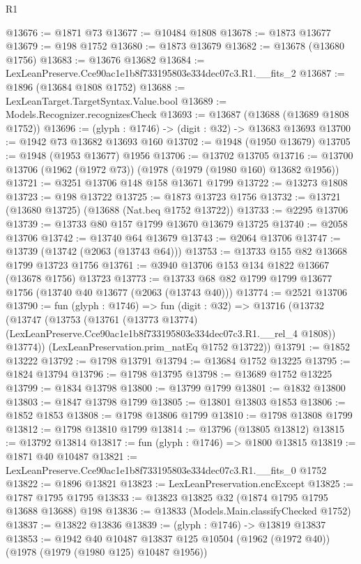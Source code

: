 \begin{lexlean}{R1}
\begin{coremodule}
@13676 := @1871 @73
@13677 := @10484 @1808
@13678 := @1873 @13677
@13679 := @198 @1752
@13680 := @1873 @13679
@13682 := @13678 (@13680 @1756)
@13683 := @13676 @13682
@13684 := LexLeanPreserve.Cce90ac1e1b8f733195803e334dec07c3.R1.__fits_2
@13687 := @1896 (@13684 @1808 @1752)
@13688 := LexLeanTarget.TargetSyntax.Value.bool
@13689 := Models.Recognizer.recognizesCheck
@13693 := @13687 (@13688 (@13689 @1808 @1752))
@13696 := (glyph : @1746) -> (digit : @32) -> @13683 @13693
@13700 := @1942 @73 @13682 @13693 @160
@13702 := @1948 (@1950 @13679)
@13705 := @1948 (@1953 @13677) @1956
@13706 := @13702 @13705
@13716 := @13700 @13706 (@1962 (@1972 @73)) (@1978 (@1979 (@1980 @160) @13682 @1956))
@13721 := @3251 @13706 @148 @158 @13671 @1799
@13722 := @13273 @1808
@13723 := @198 @13722
@13725 := @1873 @13723 @1756
@13732 := @13721 (@13680 @13725) (@13688 (Nat.beq @1752 @13722))
@13733 := @2295 @13706
@13739 := @13733 @80 @157 @1799 @13670 @13679 @13725
@13740 := @2058 @13706
@13742 := @13740 @64 @13679
@13743 := @2064 @13706
@13747 := @13739 (@13742 (@2063 (@13743 @64)))
@13753 := @13733 @155 @82 @13668 @1799 @13723 @1756
@13761 := @3940 @13706 @153 @134 @1822 @13667 (@13678 @1756) @13723
@13773 := @13733 @68 @82 @1799 @1799 @13677 @1756 (@13740 @40 @13677 (@2063 (@13743 @40)))
@13774 := @2521 @13706
@13790 := fun (glyph : @1746) =>
  fun (digit : @32) =>
  @13716
    (@13732
      (@13747
        (@13753
          (@13761
            (@13773 @13774)
            (LexLeanPreserve.Cce90ac1e1b8f733195803e334dec07c3.R1.__rel_4 @1808))
          @13774))
      (LexLeanPreservation.prim_natEq @1752 @13722))
@13791 := @1852 @13222
@13792 := @1798 @13791
@13794 := @13684 @1752 @13225
@13795 := @1824 @13794
@13796 := @1798 @13795
@13798 := @13689 @1752 @13225
@13799 := @1834 @13798
@13800 := @13799 @1799
@13801 := @1832 @13800
@13803 := @1847 @13798 @1799
@13805 := @13801 @13803 @1853
@13806 := @1852 @1853
@13808 := @1798 @13806 @1799
@13810 := @1798 @13808 @1799
@13812 := @1798 @13810 @1799
@13814 := @13796 (@13805 @13812)
@13815 := @13792 @13814
@13817 := fun (glyph : @1746) => @1800 @13815
@13819 := @1871 @40 @10487
@13821 := LexLeanPreserve.Cce90ac1e1b8f733195803e334dec07c3.R1.__fits_0 @1752
@13822 := @1896 @13821
@13823 := LexLeanPreservation.encExcept
@13825 := @1787 @1795 @1795
@13833 := @13823 @13825 @32 (@1874 @1795 @1795 @13688 @13688) @198
@13836 := @13833 (Models.Main.classifyChecked @1752)
@13837 := @13822 @13836
@13839 := (glyph : @1746) -> @13819 @13837
@13853 := @1942
    @40
    @10487
    @13837
    @125
    @10504
    (@1962 (@1972 @40))
    (@1978 (@1979 (@1980 @125) @10487 @1956))

\end{coremodule}
\end{lexlean}
